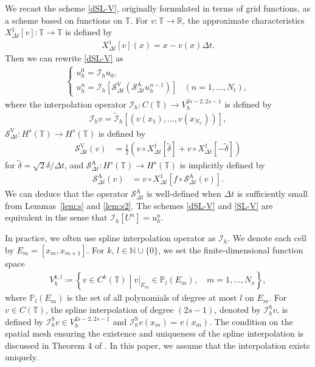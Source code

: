 \documentclass[10pt,a4paper,tbtags,leqno]{amsart}
\theoremstyle{definition}
\numberwithin{equation}{section}
\newcommand{\relmiddle}{\mathrel{}\middle|\mathrel{}}
\begin{document}
We recast the scheme \eqref{dSL-V}, originally formulated in terms of grid functions, as a scheme based on functions on $ \mathbb{T} $. For $ v: \mathbb{T} \to \mathbb{R} $, the approximate characteristics $ {X_{\Delta t}^1}[v] : \mathbb{T} \to \mathbb{T} $ is defined by 
\begin{align} 
  {X_{\Delta t}^1}[v] (x) = x - v(x) \Delta t. 
\end{align} 
Then we can rewrite \eqref{dSL-V} as 
\begin{align} 
  \label{SL-V} 
  \begin{cases} 
    u_h^0 = \mathcal{I}_h u_0, & \\ 
    u_h^{n} = \mathcal{I}_h \left[\mathcal{S}_{\Delta t}^{\mathrm{V}} (\mathcal{S}_{\Delta t}^{\mathrm{A}} u_h^{n - 1})\right] & (n = 1, \ldots, N_t), 
  \end{cases} 
\end{align} 
where the interpolation operator $ \mathcal{I}_h: C(\mathbb{T}) \to V_h^{2s-2, 2s-1} $ is defined by 
\begin{align} 
  \mathcal{I}_h v = \tilde{\mathcal{I}}_h [\left(v(x_1), \ldots, v(x_{N_x})\right)], 
\end{align} 
$ \mathcal{S}_{\Delta t}^{\mathrm{V}}: H^s (\mathbb{T}) \to H^s (\mathbb{T}) $ is defined by 
\begin{align} 
  \mathcal{S}_{\Delta t}^{\mathrm{V}} (v) & = \frac{1}{2} \left(v \circ {X_{\Delta t}^1}[\tilde{\delta}] + v \circ {X_{\Delta t}^1}[-\tilde{\delta}]\right) 
\end{align} 
for $ \tilde{\delta} = \sqrt{2} \delta / \Delta t $, and $ \mathcal{S}_{\Delta t}^{\mathrm{A}} : H^s (\mathbb{T}) \to H^s (\mathbb{T}) $ is implicitly defined by 
\begin{align} 
  \mathcal{S}_{\Delta t}^{\mathrm{A}} (v) & = v \circ {X_{\Delta t}^1} [f \circ \mathcal{S}_{\Delta t}^{\mathrm{A}} (v)]. \label{def_sa} 
\end{align} 
We can deduce that the operator $ \mathcal{S}_{\Delta t}^{\mathrm{A}} $ is well-defined when $ \Delta t $ is sufficiently small from Lemmas~\ref{lem:s} and \ref{lem:s2}. The schemes \eqref{dSL-V} and \eqref{SL-V} are equivalent in the sense that $ \mathcal{I}_h [U^{n}] = u_h^n $. 

In practice, we often use spline interpolation operator as $ \mathcal{I}_h $. We denote each cell by $ E_m = [x_m, x_{m + 1}] $. For $ k $, $ l \in \mathbb{N} \cup \{0\} $, we set the finite-dimensional function space 
\begin{align} 
  V_h^{k, l} \coloneqq \left\{v \in C^{k} (\mathbb{T}) \relmiddle v|_{E_m} \in \mathbb{P}_{l} (E_m), \quad m  = 1, \ldots, N_x \right\}, 
\end{align} 
where $ \mathbb{P}_{l} (E_m) $ is the set of all polynomials of degree at most $ l $ on $ E_m $. For $ v \in C (\mathbb{T}) $, the spline interpolation of degree $ (2 s - 1) $, denoted by $ \mathcal{I}_h^{\mathrm{S}} v $, is defined by $ \mathcal{I}_h^{\mathrm{S}} v \in V_h^{2s-2, 2s-1} $ and $ \mathcal{I}_h^{\mathrm{S}} v (x_m) = v (x_m) $. The condition on the spatial mesh ensuring the existence and uniqueness of the spline interpolation is discussed in Theorem 4 of \cite{64AhNiWa}. In this paper, we assume that the interpolation exists uniquely. 
\end{document}
